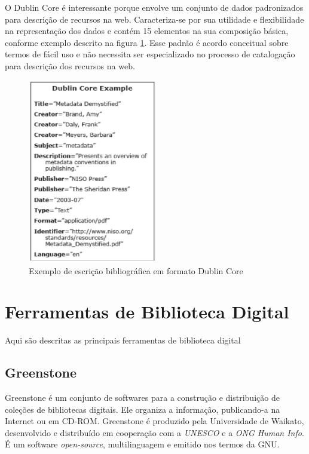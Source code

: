 O Dublin Core é interessante porque envolve um conjunto de dados padronizados para descrição de recursos na web. Caracteriza-se por sua utilidade e flexibilidade na representação dos dados e contém 15 elementos na sua composição básica, conforme exemplo descrito na figura \ref{fig:exdublincore}. Esse padrão é acordo conceitual sobre termos de fácil uso e não necessita ser especializado no processo de catalogação para descrição dos recursos na web.

\graphicspath{{figuras/}}
\begin{figure}[H]
\centering
\includegraphics[width=0.5\textwidth]{exemplo_dublincore}
\caption{Exemplo de escrição bibliográfica em formato Dublin Core}
\label{fig:exdublincore}
\end{figure}

\section{Ferramentas de Biblioteca Digital}

Aqui são descritas as principais ferramentas de biblioteca digital

\subsection{Greenstone} 

Greenstone é um conjunto de softwares para a construção e distribuição de coleções de bibliotecas digitais. Ele organiza a informação, publicando-a na Internet ou em CD-ROM. Greenstone é produzido pela Universidade de Waikato, desenvolvido e distribuído em cooperação com a \textit{UNESCO} e a \textit{ONG Human Info}. É um software \textit{open-source}, multilinguagem e emitido nos termos da GNU.
 

